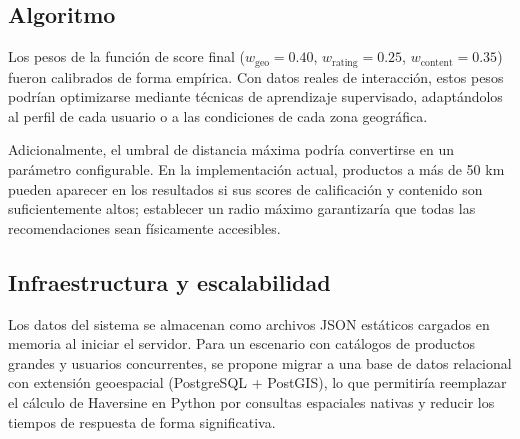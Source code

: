 \documentclass[11pt, letterpaper]{article}
\begin{document}
	\subsection*{Algoritmo}
	
	Los pesos de la función de score final
	($w_{\text{geo}} = 0.40$, $w_{\text{rating}} = 0.25$,
	$w_{\text{content}} = 0.35$) fueron calibrados de forma empírica.
	Con datos reales de interacción, estos pesos podrían optimizarse mediante
	técnicas de aprendizaje supervisado, adaptándolos al perfil de cada usuario
	o a las condiciones de cada zona geográfica.
	
	Adicionalmente, el umbral de distancia máxima podría convertirse en un
	parámetro configurable. En la implementación actual, productos a más de
	50 km pueden aparecer en los resultados si sus scores de calificación y
	contenido son suficientemente altos; establecer un radio máximo garantizaría
	que todas las recomendaciones sean físicamente accesibles.
	
	\subsection*{Infraestructura y escalabilidad}
	
	Los datos del sistema se almacenan como archivos JSON estáticos cargados
	en memoria al iniciar el servidor. Para un escenario con catálogos de
	productos grandes y usuarios concurrentes, se propone migrar a una base
	de datos relacional con extensión geoespacial (PostgreSQL + PostGIS),
	lo que permitiría reemplazar el cálculo de Haversine en Python por
	consultas espaciales nativas y reducir los tiempos de respuesta de forma
	significativa.
	
	\printbibliography
	
	
\end{document}
